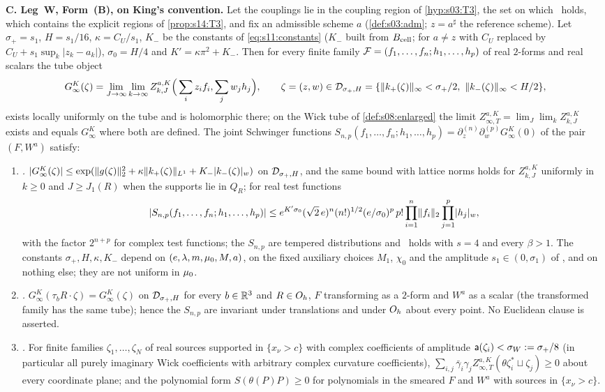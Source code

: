 \begin{theorem}
\smallskip\noindent\textbf{C. Leg~W, Form~(B), on King's convention.} Let the couplings lie in the coupling region of \cref{hyp:s03:T3}, the set on which \Tthree\ holds, which contains the explicit regions of \cref{prop:s14:T3}, and fix an admissible scheme $a$ (\cref{def:s03:adm}; $z=a^\sharp$ the reference scheme). Let $\sigma_+=s_1$, $H=s_1/16$, $\kappa=C_U/s_1$, $K_-$ be the constants of \eqref{eq:s11:constants} ($K_-$ built from $B_{\rm cell}$; for $a\ne z$ with $C_U$ replaced by $C_U+s_1\sup_k|z_k-a_k|$), $\sigma_0=H/4$ and $K'=\kappa\pi^2+K_-$. Then for every finite family $\mathcal F=(f_1,\dots,f_n;h_1,\dots,h_p)$ of real $2$-forms and real scalars the tube object
\[
G^K_\infty(\zeta)=\lim_{J\to\infty}\lim_{k\to\infty}Z^{a,K}_{k,J}\Big(\sum_iz_if_i,\sum_jw_jh_j\Big),\qquad\zeta=(z,w)\in\Dtube=\{\norm{k_+(\zeta)}_\infty<\sigma_+/2,\ \norm{k_-(\zeta)}_\infty<H/2\},
\]
exists locally uniformly on the tube and is holomorphic there; on the Wick tube of \cref{def:s08:enlarged} the limit $Z^{a,K}_{\infty,T}=\lim_J\lim_kZ^{a,K}_{k,J}$ exists and equals $G^K_\infty$ where both are defined. The joint Schwinger functions $S_{n,p}(f_1,\dots,f_n;h_1,\dots,h_p)=\partial^{(n)}_z\partial^{(p)}_wG^K_\infty(0)$ of the pair $(F,W^a)$ satisfy:
\begin{enumerate}[label=\textup{(\roman*)},leftmargin=*]
\item \emph{\OSz.} $|G^K_\infty(\zeta)|\le\exp(\lVert g(\zeta)\rVert_2^2+\kappa\lVert k_+(\zeta)\rVert_{L^1}+K_-\lvert k_-(\zeta)\rvert_{w})$ on $\mathcal D_{\sigma_+,H}$, and the same bound with lattice norms holds for $Z^{a,K}_{k,J}$ uniformly in $k\ge0$ and $J\ge J_1(R)$ when the supports lie in $Q_R$; for real test functions
\[
|S_{n,p}(f_1,\dots,f_n;h_1,\dots,h_p)|\le e^{K'\sigma_0}(\sqrt2\,e)^n(n!)^{1/2}(e/\sigma_0)^p\,p!\prod_{i=1}^n\lVert f_i\rVert_2\prod_{j=1}^p\lvert h_j\rvert_{w},
\]
with the factor $2^{n+p}$ for complex test functions; the $S_{n,p}$ are tempered distributions and \Ezz\ holds with $s=4$ and every $\beta>1$. The constants $\sigma_+,H,\kappa,K_-$ depend on $(e,\lambda,m,\mu_0,M,a)$, on the fixed auxiliary choices $M_1$, $\chi_0$ and the amplitude $s_1\in(0,\sigma_1)$ of \Itwo, and on nothing else; they are not uniform in $\mu_0$.
\item \emph{\OSo.} $G^K_\infty(\tau_bR\cdot\zeta)=G^K_\infty(\zeta)$ on $\mathcal D_{\sigma_+,H}$ for every $b\in\mathbb R^3$ and $R\in O_h$, $F$ transforming as a $2$-form and $W^a$ as a scalar (the transformed family has the same tube); hence the $S_{n,p}$ are invariant under translations and under $O_h$ about every point. No Euclidean clause is asserted.
\item \emph{\OSt.} For finite families $\zeta_1,\dots,\zeta_N$ of real sources supported in $\{x_\nu>c\}$ with complex coefficients of amplitude $\mathsf a(\zeta_i)<\sigma_W:=\sigma_+/8$ (in particular all purely imaginary Wick coefficients with arbitrary complex curvature coefficients), $\sum_{i,j}\bar\gamma_i\gamma_jZ^{a,K}_{\infty,T}(\theta\zeta_i^*\sqcup\zeta_j)\ge0$ about every coordinate plane; and the polynomial form $S(\theta(P)P)\ge0$ for polynomials in the smeared $F$ and $W^a$ with sources in $\{x_\nu>c\}$.

\end{enumerate}
\end{theorem}
